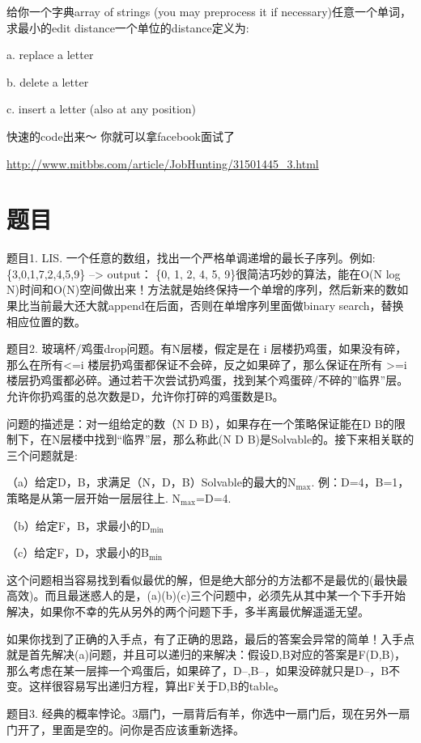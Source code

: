 \documentclass[12pt]{book}
\begin{document}
给你一个字典array of strings (you may preprocess it if necessary)任意一个单词，求最小的edit distance一个单位的distance定义为:

a. replace a letter

b. delete a letter

c. insert a letter (also at any position)

快速的code出来～ 你就可以拿facebook面试了

\url{http://www.mitbbs.com/article/JobHunting/31501445_3.html}

\section{题目}
\label{sec-18-2}

题目1. LIS. 一个任意的数组，找出一个严格单调递增的最长子序列。例如: \{3,0,1,7,2,4,5,9\} –> output： \{0, 1, 2, 4, 5, 9\}很简洁巧妙的算法，能在O(N log N)时间和O(N)空间做出来！方法就是始终保持一个单增的序列，然后新来的数如果比当前最大还大就append在后面，否则在单增序列里面做binary search，替换相应位置的数。

题目2. 玻璃杯/鸡蛋drop问题。有N层楼，假定是在 i 层楼扔鸡蛋，如果没有碎，那么在所有<=i 楼层扔鸡蛋都保证不会碎，反之如果碎了，那么保证在所有 >=i 楼层扔鸡蛋都必碎。通过若干次尝试扔鸡蛋，找到某个鸡蛋碎/不碎的”临界”层。允许你扔鸡蛋的总次数是D，允许你打碎的鸡蛋数是B。

问题的描述是：对一组给定的数（N D B），如果存在一个策略保证能在D B的限制下，在N层楼中找到“临界”层，那么称此(N D B)是Solvable的。接下来相关联的三个问题就是:

（a）给定D，B，求满足（N，D，B）Solvable的最大的N$_{\text{max}}$. 例：D=4，B=1， 策略是从第一层开始一层层往上. N$_{\text{max}}$=D=4.

（b）给定F，B，求最小的D$_{\text{min}}$

（c）给定F，D，求最小的B$_{\text{min}}$

这个问题相当容易找到看似最优的解，但是绝大部分的方法都不是最优的(最快最高效)。而且最迷惑人的是，(a)(b)(c)三个问题中，必须先从其中某一个下手开始解决，如果你不幸的先从另外的两个问题下手，多半离最优解遥遥无望。

如果你找到了正确的入手点，有了正确的思路，最后的答案会异常的简单！入手点就是首先解决(a)问题，并且可以递归的来解决：假设D,B对应的答案是F(D,B)，那么考虑在某一层摔一个鸡蛋后，如果碎了，D--,B--，如果没碎就只是D--，B不变。这样很容易写出递归方程，算出F关于D,B的table。

题目3. 经典的概率悖论。3扇门，一扇背后有羊，你选中一扇门后，现在另外一扇门开了，里面是空的。问你是否应该重新选择。
\end{document}
